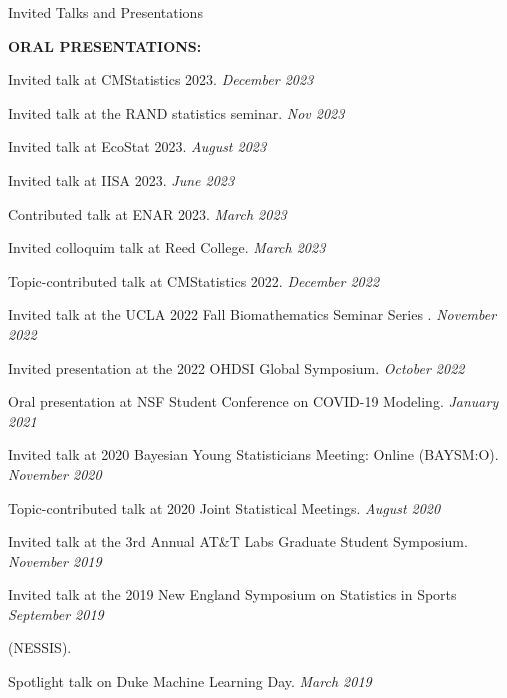 \documentclass{resume} %
\begin{document}
\begin{rSection}{Invited Talks and Presentations}

\textbf{ORAL PRESENTATIONS:}

Invited talk at CMStatistics 2023. \hfill {\em December 2023}

Invited talk at the RAND statistics seminar. \hfill {\em Nov 2023}

Invited talk at EcoStat 2023. \hfill {\em August 2023}

Invited talk at IISA 2023.  \hfill {\em June 2023}

%

Contributed talk at ENAR 2023. \hfill {\em March 2023}

Invited colloquim talk at Reed College. \hfill {\em March 2023}

Topic-contributed talk at CMStatistics 2022. \hfill {\em December 2022}

Invited talk at the UCLA 2022 Fall Biomathematics Seminar Series . \hfill {\em November 2022}

Invited presentation at the 2022 OHDSI Global Symposium.  \hfill {\em October 2022}

{Oral presentation at NSF Student Conference on COVID-19 Modeling.} \hfill {\em January 2021}

{Invited talk at 2020 Bayesian Young Statisticians Meeting: Online (BAYSM:O).} \hfill {\em November 2020}

{Topic-contributed talk at 2020 Joint Statistical Meetings. } \hfill {\em August 2020}

{Invited talk at the 3rd Annual AT\&T Labs Graduate Student Symposium.} \hfill {\em November 2019}


{Invited talk at the 2019 New England Symposium on Statistics in Sports} \hfill {\em September 2019}

\vspace{-0.1in}
 (NESSIS).
 
Spotlight talk on Duke Machine Learning Day. \hfill {\em March 2019}




\end{rSection}
\end{document}
